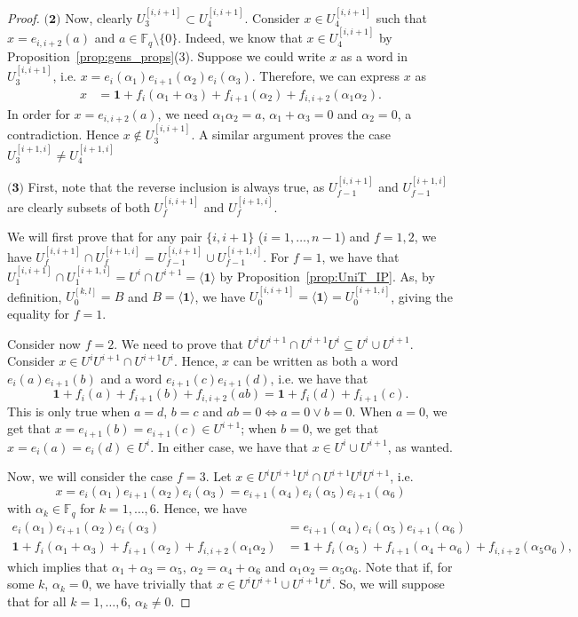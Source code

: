 \documentclass[11pt,letterpaper]{amsart}
\newcommand{\FF}{\mathbb{F}}
\begin{document}
\begin{proof}
    $\textbf{(2)}$ Now, clearly $U_3^{[i,i+1]}\subset U_4^{[i,i+1]}$. Consider $x\in U_4^{[i,i+1]}$ such that $x=e_{i,i+2}(a)$ and $a\in \FF_q\setminus \{ 0\}$. Indeed, we know that $x\in U_4^{[i,i+1]}$ by Proposition~\ref{prop:gens_props}(3).
    Suppose we could write $x$ as a word in $U_3^{[i,i+1]}$, i.e. $x = e_i(\alpha_1)e_{i+1}(\alpha_2)e_i(\alpha_3)$.
    Therefore, we can express $x$ as 
    \begin{align*}
        x&= \mathbf{1} + f_i(\alpha_1+\alpha_3)+f_{i+1}(\alpha_2)+f_{i,i+2}(\alpha_1\alpha_2).
    \end{align*}
    In order for $x=e_{i,i+2}(a)$, we need $\alpha_1\alpha_2=a$, $\alpha_1+\alpha_3=0$ and $\alpha_2=0$, a contradiction.
    Hence $x\notin U_3^{[i,i+1]}$.
    A similar argument proves the case $U_3^{[i+1,i]}\neq U_4^{[i+1,i]}$

    $\textbf{(3)}$ 
    First, note that the reverse inclusion is always true, as  $U_{f-1}^{[i,i+1]}$ and $U_{f-1}^{[i+1,i]}$ are clearly subsets of both $U_{f}^{[i,i+1]}$ and $U_{f}^{[i+1,i]}$. 
    
    We will first prove that for any pair $\{i,i+1\}$ ($i=1,\ldots,n-1$) and $f=1,2$, we have $U^{[i,i+1]}_f\cap U^{[i+1,i]}_f = U^{[i,i+1]}_{f-1}\cup U^{[i+1,i]}_{f-1}$.
    For $f=1$, we have that $U^{[i,i+1]}_1\cap U_1^{[i+1,i]} = U^i\cap U^{i+1} = \langle \mathbf{1}\rangle$ by Proposition~\ref{prop:UniT_IP}. As, by definition, $U_0^{[k,l]}=B$ and $B=\langle \mathbf{1}\rangle$, we have $U_0^{[i,i+1]}=\langle \mathbf{1}\rangle = U_0^{[i+1,i]}$, giving the equality for $f=1$.
    
    Consider now $f=2$.
    We need to prove that $U^iU^{i+1}\cap U^{i+1}U^{i} \subseteq   U^i \cup U^{i+1}$.
    Consider $x\in U^iU^{i+1}\cap U^{i+1}U^i$.
    Hence, $x$ can be written as both a word $e_i(a)e_{i+1}(b)$ and a word $e_{i+1}(c)e_{i+1}(d)$, i.e. we have that $$\mathbf{1}+f_i(a)+f_{i+1}(b)+f_{i,i+2}(ab) = \mathbf{1} + f_i(d)+f_{i+1}(c).$$
    This is only true when $a=d$, $b=c$ and $ab=0\Leftrightarrow a=0\vee b=0$.
    When $a=0$, we get that $x=e_{i+1}(b)=e_{i+1}(c)\in U^{i+1}$; when $b=0$, we get that $x=e_i(a)=e_i(d)\in U^i$. In either case, we have that $x\in U^i\cup U^{i+1}$, as wanted.

    Now, we will consider the case $f=3$. Let $x\in U^iU^{i+1}U^i\cap U^{i+1}U^{i}U^{i+1}$, i.e.
    $$x=e_i(\alpha_1)e_{i+1}(\alpha_2)e_{i}(\alpha_3) = e_{i+1}(\alpha_4)e_{i}(\alpha_5)e_{i+1}(\alpha_6)$$ with $\alpha_k\in \FF_q$ for $k=1,\ldots,6$. 
    Hence, we have 
    \begin{align*}
        e_i(\alpha_1)e_{i+1}(\alpha_2)e_{i}(\alpha_3) &= e_{i+1}(\alpha_4)e_{i}(\alpha_5)e_{i+1}(\alpha_6)\\
        \mathbf{1} + f_i(\alpha_1+\alpha_3)+f_{i+1}(\alpha_2)+f_{i,i+2}(\alpha_1\alpha_2)&=\mathbf{1}+f_i(\alpha_5)+f_{i+1}(\alpha_4+\alpha_6)+f_{i,i+2}(\alpha_5\alpha_6),
    \end{align*}
    which implies that $\alpha_1+\alpha_3=\alpha_5$, $\alpha_2=\alpha_4+\alpha_6$ and $\alpha_1\alpha_2=\alpha_5\alpha_6$.
    Note that if, for some $k$, $\alpha_k=0$, we have trivially that $x\in U^iU^{i+1}\cup U^{i+1}U^i$. So, we will suppose that for all $k=1,\ldots,6$, $\alpha_k\neq 0$.
    

\end{proof}
\end{document}
